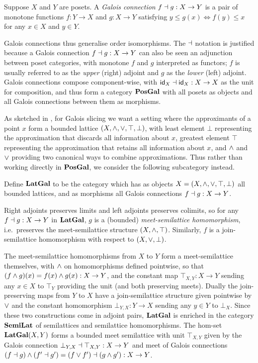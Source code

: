 \begin{definition}
Suppose $X$ and $Y$ are posets. A \emph{Galois connection} $f \dashv g: X \to Y$ is a pair of monotone functions
$f: Y \to X$ and $g: X \to Y$ satisfying $y \leq g(x) \iff f(y) \leq x$ for any $x \in X$ and $y \in Y$.
\end{definition}

\noindent Galois connections thus generalise order isomorphisms. The $\dashv$ notation is justified because a
Galois connection $f \dashv g: X \to Y$ can also be seen an adjunction between poset categories, with monotone
$f$ and $g$ interpreted as functors; $f$ is usually referred to as the \emph{upper} (right) adjoint and $g$ as
the \emph{lower} (left) adjoint. Galois connections compose component-wise, with $\mathsf{id}_X \dashv \mathsf{id}_X: X \to X$
as the unit for composition, and thus form a category $\mathbf{PosGal}$ with all posets as objects and all Galois
connections between them as morphisms.

As sketched in , for Galois slicing we want a setting where the
approximants of a point $x$ form a bounded lattice $(X, \wedge, \vee, \top, \bot)$, with least element $\bot$
representing the approximation that discards all information about $x$, greatest element $\top$ representing
the approximation that retains all information about $x$, and $\wedge$ and $\vee$ providing two canonical ways
to combine approximations. Thus rather than working directly in $\mathbf{PosGal}$, we consider the following
subcategory instead.

\begin{definition}
Define $\mathbf{LatGal}$ to be the category which has as objects $X = (X, \wedge, \vee, \top, \bot)$ all bounded
lattices, and as morphisms all Galois connections $f \dashv g: X \to Y$.
\end{definition}

\noindent Right adjoints preserves limits and left adjoints preserves colimits, so for any $f \dashv g: X \to Y$
in $\mathbf{LatGal}$, $g$ is a (bounded) \emph{meet-semilattice homomorphism}, i.e.~preserves the meet-semilattice
structure $(X, \wedge, \top)$. Similarly, $f$ is a join-semilattice homomorphism with respect to $(X, \vee,
\bot)$.

The meet-semilattice homomorphisms from $X$ to $Y$ form a meet-semilattice themselves, with $\wedge$ on
homomorphisms defined pointwise, so that $(f \wedge g)(x) = f(x) \wedge g(x): X \to Y$, and the constant map
$\top_{X,Y}: X \to Y$ sending any $x \in X$ to $\top_Y$ providing the unit (and both preserving meets). Dually
the join-preserving maps from $Y$ to $X$ have a join-semilattice structure given pointwise by $\vee$ and the
constant homomorphism $\bot_{Y,X}: Y \to X$ sending any $y \in Y$ to $\bot_X$. Since these two constructions
come in adjoint pairs, $\mathbf{LatGal}$ is enriched in the category $\mathbf{SemiLat}$ of semilattices and semilattice
homomorphisms. The hom-set $\mathbf{LatGal}(X,Y)$ forms a bounded meet semilattice with unit $\top_{X,Y}$ given by the
Galois connection $\bot_{Y,X} \dashv \top_{X,Y}: X \to Y$ and meet of Galois connections $(f \dashv g) \wedge (f'
\dashv g') = (f \vee f') \dashv (g \wedge g'): X \to Y$.


